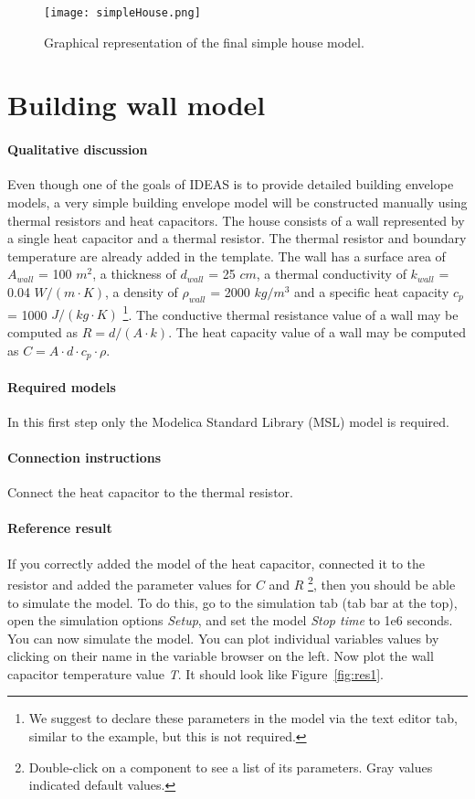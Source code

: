 \documentclass[10pt,a4paper]{article}
\begin{document}
\newpage
 
\begin{figure}[h!]
\centering
\texttt{[image: simpleHouse.png]}
\caption{Graphical representation of the final simple house model.}
\label{fig:simpleHouse}
\end{figure}

\newpage

\section{Building wall model}
\paragraph{Qualitative discussion}
Even though one of the goals of IDEAS is to provide
detailed building envelope models, a very simple building
envelope model will be constructed manually using thermal
resistors and heat capacitors.
The house consists of a wall represented 
by a single heat capacitor and a thermal resistor. 
The thermal resistor and boundary temperature 
are already added in the template.
The wall has a surface area of $A_{wall}$ = 100 $m^2$, 
a thickness of $d_{wall}$ = 25 $cm$, 
a thermal conductivity of $k_{wall}$ = 0.04 $W/(m\cdot K)$, 
a density of $\rho_{wall}$ = 2000 $kg/m^3$ and a specific heat capacity $c_p$ = 1000 $J/(kg\cdot K)$
\footnote{We suggest to declare these parameters in the model via the text editor tab, similar to the example, but this is not required.}.
The conductive thermal resistance value of a wall may be computed as $R=d/(A\cdot k)$.
The heat capacity value of a wall may be computed as $C=A\cdot d \cdot c_p \cdot \rho$.

\paragraph{Required models}
In this first step only the Modelica Standard Library (MSL) 
model 
is required.

\paragraph{Connection instructions}
Connect the heat capacitor to the thermal resistor.

\paragraph{Reference result}
If you correctly added the model of the heat capacitor, connected it to the resistor and 
added the parameter values for $C$ and $R$
\footnote{Double-click on a component to see a list of its parameters. Gray values indicated default values.},
then you should be able to simulate the model.
To do this, go to the simulation tab (tab bar at the top),
open the simulation options \textit{Setup},
and set the model \textit{Stop time} to 1e6 seconds.
You can now simulate the model.
You can plot individual variables values by clicking on their name in the variable browser on the left.
Now plot the wall capacitor temperature value \textit{T}. 
It should look like Figure~\ref{fig:res1}.
\end{document}
